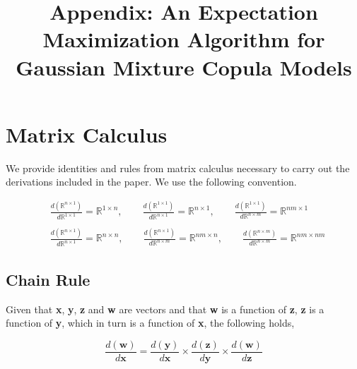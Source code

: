 \documentclass[]{article}
\title{Appendix: An Expectation Maximization Algorithm for Gaussian Mixture Copula Models}
\begin{document}
\maketitle

\DeclareRobustCommand{\erf}{\textmd{erf}}

\DeclareRobustCommand{\llDenom}[1] {\prod\limits_{r=1}^{d}\psi_{r}\left(z_r({#1});\beta_r \right) }

\DeclareRobustCommand{\invCDF}[1]{ \textbf{z}({#1}) }

\DeclareRobustCommand{\der}[2] {\frac{d \left({#2}\right)}{d{#1}}}

\DeclareRobustCommand{\zbar}[1] {\bar{\textbf{z}}({#1})}

\appendix

\section{Matrix Calculus}\label{sec:matrix_calculus}
We provide identities and rules from matrix calculus necessary to carry out the derivations included in the paper. We use the following convention.

\begin{align*}
& \der{\mathbb{R}^{1\times 1}}{\mathbb{R}^{n\times 1}} = \mathbb{R}^{1\times n}, \qquad \der{\mathbb{R}^{n\times 1}}{\mathbb{R}^{1\times 1}} = \mathbb{R}^{n\times 1}, \qquad \der{\mathbb{R}^{n\times m}}{\mathbb{R}^{1\times 1}} = \mathbb{R}^{nm\times 1} \\ \\
&  \der{\mathbb{R}^{n\times 1}}{\mathbb{R}^{n\times 1}} = \mathbb{R}^{n\times n}, \qquad\der{\mathbb{R}^{n\times m}}{\mathbb{R}^{n\times 1}} = \mathbb{R}^{nm\times n}, \qquad \der{\mathbb{R}^{n\times m}}{\mathbb{R}^{n\times m}} = \mathbb{R}^{nm\times nm} 
\end{align*}

\subsection{Chain Rule}
Given that  \textbf{x}, \textbf{y}, \textbf{z} and  \textbf{w} are vectors and that \textbf{w} is a function of \textbf{z}, \textbf{z} is a function of \textbf{y}, which in turn is a function of \textbf{x}, the following holds,

\begin{equation}\label{eq:chain_rule}
\der{\textbf{x}}{\textbf{w}} =\der{\textbf{x}}{\textbf{y}} \times \der{\textbf{y}}{\textbf{z}} \times \der{\textbf{z}}{\textbf{w}}
\end{equation}
\end{document}
